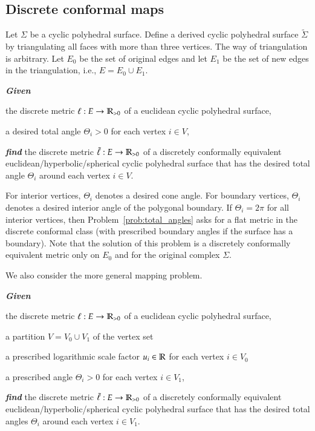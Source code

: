\documentclass[Thesis]{subfiles}
\begin{document}
\subsection{Discrete conformal maps}

Let $\Sigma$ be a cyclic polyhedral surface. Define a derived cyclic polyhedral
surface $\tilde \Sigma$ by triangulating all faces with more than three vertices. The way of triangulation
is arbitrary. Let $E_0$ be the set of original edges and let $E_1$ be the set of new edges
in the triangulation, i.e., $E=E_0\cup E_1$.

\begin{problem}
\label{prob:total_angles}
\textbf{\itshape{Given}}
\begin{compactitem}
\item the discrete metric $\ell:E\rightarrow\mathbb R_{>0}$ of a euclidean cyclic polyhedral surface,
\item a desired total angle $\Theta_{i}>0$ for each vertex $i\in V$,
\end{compactitem}
\smallskip\noindent%
\textbf{\itshape{find}} the discrete metric $\tilde\ell:E\rightarrow\mathbb R_{>0}$ of a discretely conformally equivalent euclidean/hyperbolic/spherical cyclic polyhedral surface that has the desired total angle $\Theta_{i}$ around each vertex $i\in V$.
\end{problem}

For interior vertices, $\Theta_i$ denotes a desired cone angle. 
For boundary vertices, $\Theta_i$ denotes a desired interior angle of the polygonal boundary. 
If $\Theta_{i}=2\pi$ for all interior vertices, then Problem~\ref{prob:total_angles} asks for a flat metric in the discrete conformal class (with prescribed boundary angles if the surface has a boundary). 
Note that the solution of this problem is a discretely conformally equivalent metric only on $E_0$ and for the original complex $\Sigma$.

We also consider the more general mapping problem. 
\begin{problem}
\label{prob:factors_and_angles}
\textbf{\itshape{Given}}
\begin{compactitem}
\item the discrete metric $\ell:E\rightarrow\mathbb R_{>0}$ of a euclidean cyclic polyhedral surface,
\item a partition $V=V_0\cup V_1$ of the vertex set
\item a prescribed logarithmic scale factor $u_i\in \mathbb R$ for each vertex $i\in V_0$
\item a prescribed angle $\Theta_{i} > 0$ for each vertex $i\in V_1$,
\end{compactitem}
\smallskip\noindent%
\textbf{\itshape{find}} the discrete metric $\tilde\ell:E\rightarrow\mathbb R_{>0}$ of a discretely conformally equivalent euclidean/hyperbolic/spherical cyclic polyhedral surface that has the desired total angles $\Theta_{i}$ around each vertex $i\in V_1$.
\end{problem}
\end{document}
